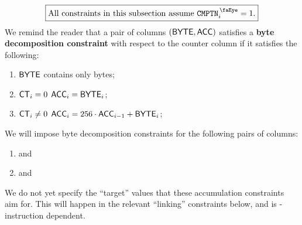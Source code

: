 \[
    \boxed{\text{All constraints in this subsection assume } \isComputation _{i} = 1.}
\]
We remind the reader that a pair of columns $(\textsf{BYTE}, \textsf{ACC})$ satisfies a
\textbf{byte decomposition constraint} with respect to the counter column \ct{} if it satisfies the following:
\begin{enumerate}
    \item $\textsf{BYTE}$ contains only bytes;
    \item \If $\textsf{CT}_{i} = 0$    \Then $\textsf{ACC}_{i} = \textsf{BYTE}_{i}$;
    \item \If $\textsf{CT}_{i} \neq 0$ \Then $\textsf{ACC}_{i} = 256 \cdot \textsf{ACC}_{i - 1} + \textsf{BYTE}_{i}$;
\end{enumerate}
We will impose byte decomposition constraints for the following pairs of columns:
\begin{multicols}{2}
       \begin{enumerate}
           \item \compRawByte{} and \compRawAcc{}
           \item \compTrimByte{} and \compTrimAcc{}
       \end{enumerate} 
\end{multicols}
\saNote{} We do not yet specify the ``target'' values that these accumulation constraints aim for.
This will happen in the relevant ``linking'' constraints below, and is \expMod{}-instruction dependent.
